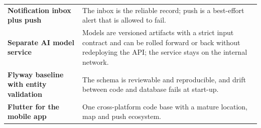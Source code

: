 {\begin{longtable}{@{}>{\raggedright\arraybackslash}p{}>{\raggedright\arraybackslash}p{}@{}}
\textbf{Notification inbox plus push} & The inbox is the reliable record; push is a best-effort alert that is allowed to fail.\\
\textbf{Separate AI model service} & Models are versioned artifacts with a strict input contract and can be rolled forward or back without redeploying the API; the service stays on the internal network.\\
\textbf{Flyway baseline with entity validation} & The schema is reviewable and reproducible, and drift between code and database fails at start-up.\\
\textbf{Flutter for the mobile app} & One cross-platform code base with a mature location, map and push ecosystem.\\
\end{longtable}}
